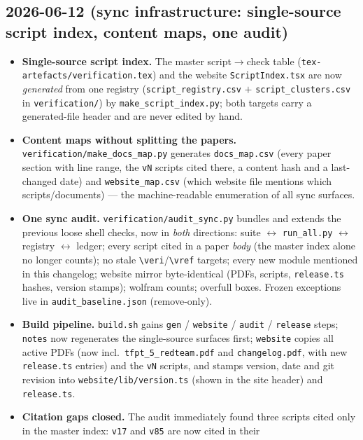 \documentclass[11pt]{article}
\providecommand{\vref}[1]{\texttt{#1}}
\begin{document}
\subsection*{2026-06-12 (sync infrastructure: single-source script index, content maps, one audit)}
\begin{itemize}
\item \textbf{Single-source script index.} The master script$\to$check table
  (\texttt{tex-artefacts/verification.tex}) and the website
  \texttt{ScriptIndex.tsx} are now \emph{generated} from one registry
  (\texttt{script\_registry.csv} $+$ \texttt{script\_clusters.csv} in
  \texttt{verification/}) by \texttt{make\_script\_index.py}; both targets carry a
  generated-file header and are never edited by hand.
\item \textbf{Content maps without splitting the papers.}
  \texttt{verification/make\_docs\_map.py} generates \texttt{docs\_map.csv} (every
  paper section with line range, the \texttt{vN} scripts cited there, a content hash
  and a last-changed date) and \texttt{website\_map.csv} (which website file mentions
  which scripts/documents) --- the machine-readable enumeration of all sync surfaces.
\item \textbf{One sync audit.} \texttt{verification/audit\_sync.py} bundles and
  extends the previous loose shell checks, now in \emph{both} directions: suite
  $\leftrightarrow$ \texttt{run\_all.py} $\leftrightarrow$ registry
  $\leftrightarrow$ ledger; every script cited in a paper \emph{body} (the master
  index alone no longer counts); no stale \texttt{\textbackslash veri}/\texttt{\textbackslash vref}
  targets; every new module mentioned in this changelog; website mirror byte-identical
  (PDFs, scripts, \texttt{release.ts} hashes, version stamps); wolfram counts; overfull
  boxes. Frozen exceptions live in \texttt{audit\_baseline.json} (remove-only).
\item \textbf{Build pipeline.} \texttt{build.sh} gains \texttt{gen} /
  \texttt{website} / \texttt{audit} / \texttt{release} steps; \texttt{notes} now
  regenerates the single-source surfaces first; \texttt{website} copies all active
  PDFs (now incl.\ \texttt{tfpt\_5\_redteam.pdf} and \texttt{changelog.pdf}, with new
  \texttt{release.ts} entries) and the \texttt{vN} scripts, and stamps version, date
  and git revision into \texttt{website/lib/version.ts} (shown in the site header) and
  \texttt{release.ts}.
\item \textbf{Citation gaps closed.} The audit immediately found three scripts cited
  only in the master index: \vref{v17} and \vref{v85} are now cited in their

\end{itemize}
\end{document}
